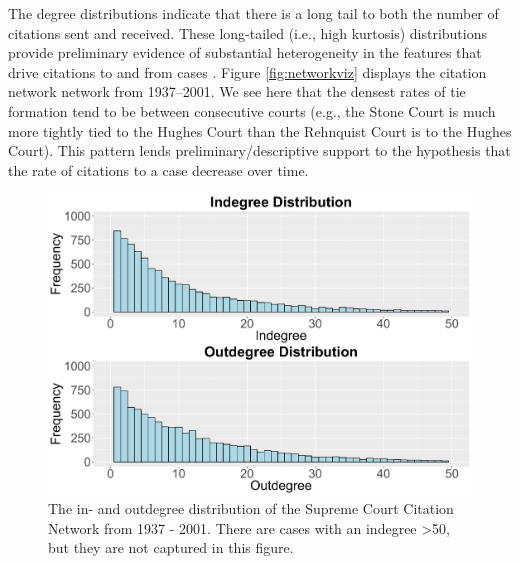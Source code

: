 \documentclass[headsepline=true, abstracton]{scrartcl}
\begin{document}
The degree distributions indicate that there is a long tail to both the number of citations sent and received. These long-tailed (i.e., high kurtosis) distributions provide preliminary evidence of substantial heterogeneity in the features that drive citations to and from cases \citep{strogatz2001exploring}. Figure \ref{fig:networkviz} displays the citation network network from 1937--2001. We see here that the densest rates of tie formation tend to be between consecutive courts (e.g., the Stone Court is much more tightly tied to the Hughes Court than the Rehnquist Court is to the Hughes Court). This pattern lends preliminary/descriptive support to the hypothesis that the rate of citations to a case decrease over time.


\begin{figure}[htp]
\includegraphics[scale=0.5]{degree_distribution}
\caption{The in- and outdegree distribution of the Supreme Court Citation Network from 1937 - 2001. There are cases with an indegree >50, but they are not captured in this figure.}
 \label{degree_dist}
\vspace{-.25cm}
\end{figure}
\end{document}

